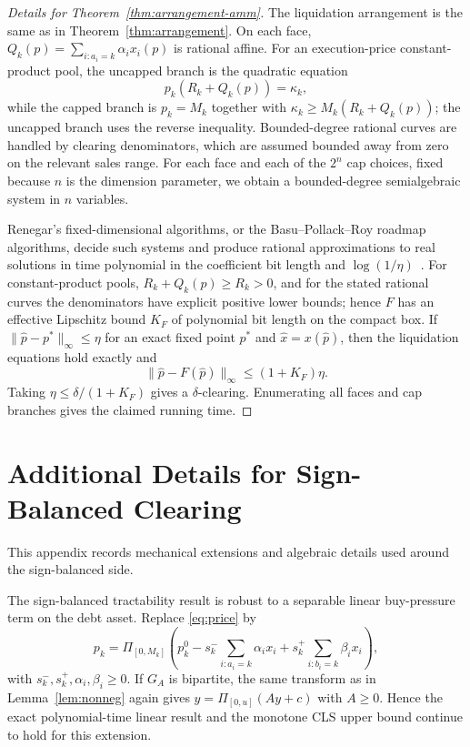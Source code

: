\documentclass{llncs}
\newcommand{\clip}{\Pi}
\newcommand{\GA}{G_A}
\begin{document}
\begin{proof}[Details for Theorem~\ref{thm:arrangement-amm}]
The liquidation arrangement is the same as in Theorem~\ref{thm:arrangement}. On each face, \(Q_k(p)=\sum_{i:a_i=k}\alpha_i x_i(p)\) is rational affine. For an execution-price constant-product pool, the uncapped branch is the quadratic equation
\[
        p_k(R_k+Q_k(p))=\kappa_k,
\]
while the capped branch is \(p_k=M_k\) together with \(\kappa_k\ge M_k(R_k+Q_k(p))\); the uncapped branch uses the reverse inequality. Bounded-degree rational curves are handled by clearing denominators, which are assumed bounded away from zero on the relevant sales range. For each face and each of the \(2^n\) cap choices, fixed because \(n\) is the dimension parameter, we obtain a bounded-degree semialgebraic system in \(n\) variables.

Renegar's fixed-dimensional algorithms, or the Basu--Pollack--Roy roadmap algorithms, decide such systems and produce rational approximations to real solutions in time polynomial in the coefficient bit length and \(\log(1/\eta)\)~\cite{Renegar1992,BasuPollackRoy2006}. For constant-product pools, \(R_k+Q_k(p)\ge R_k>0\), and for the stated rational curves the denominators have explicit positive lower bounds; hence \(F\) has an effective Lipschitz bound \(K_F\) of polynomial bit length on the compact box. If \(\|\hat p-p^\ast\|_\infty\le\eta\) for an exact fixed point \(p^\ast\) and \(\hat x=x(\hat p)\), then the liquidation equations hold exactly and
\[
        \|\hat p-F(\hat p)\|_\infty
        \le (1+K_F)\eta .
\]
Taking \(\eta\le\delta/(1+K_F)\) gives a \(\delta\)-clearing. Enumerating all faces and cap branches gives the claimed running time.
\end{proof}

\section{Additional Details for Sign-Balanced Clearing}
\label{app:zmatrix}
This appendix records mechanical extensions and algebraic details used around the sign-balanced side.

\begin{proposition}
\label{prop:buypressure}
The sign-balanced tractability result is robust to a separable linear buy-pressure term on the debt asset.  Replace \eqref{eq:price} by
\[
  p_k=\clip_{[0,M_k]}\!\left(
  p_k^0
  -s_k^-\sum_{i:a_i=k}\alpha_i x_i
  +s_k^+\sum_{i:b_i=k}\beta_i x_i
  \right),
\]
with \(s_k^-,s_k^+,\alpha_i,\beta_i\ge0\). If \(\GA\) is bipartite, the same transform as in Lemma~\ref{lem:nonneg} again gives \(y=\clip_{[0,u]}(Ay+c)\) with \(A\ge0\). Hence the exact polynomial-time linear result and the monotone CLS upper bound continue to hold for this extension.
\end{proposition}
\end{document}
